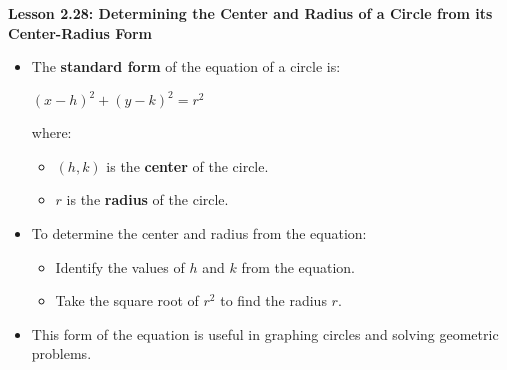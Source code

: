 \begin{center}
\textbf{Lesson 2.28: Determining the Center and Radius of a Circle from its Center-Radius Form}
\end{center}

\vspace*{-1.5ex}

\begin{itemize}
    \item The \textbf{standard form} of the equation of a circle is:

{\centering $
    (x - h)^2 + (y - k)^2 = r^2
$\par}
    where:
    \begin{itemize}
        \item $(h, k)$ is the \textbf{center} of the circle.
        \item $r$ is the \textbf{radius} of the circle.
    \end{itemize}
    \item To determine the center and radius from the equation:
    \begin{itemize}
        \item Identify the values of $h$ and $k$ from the equation.
        \item Take the square root of $r^2$ to find the radius $r$.
    \end{itemize}
    \item This form of the equation is useful in graphing circles and solving geometric problems.
\end{itemize}
